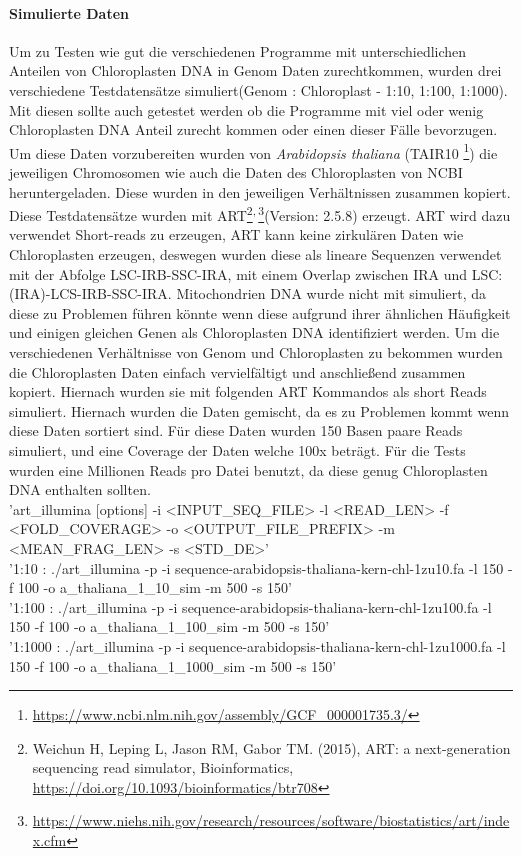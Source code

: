 \documentclass{scrartcl}
\begin{document}
\paragraph{Simulierte Daten}
\label{sec-3-1-1-1}
Um zu Testen wie gut die verschiedenen Programme mit unterschiedlichen Anteilen von Chloroplasten DNA in
Genom Daten zurechtkommen, wurden drei verschiedene Testdatensätze simuliert(Genom : Chloroplast - 1:10, 1:100, 1:1000). 
Mit diesen sollte auch getestet werden ob die Programme mit viel oder wenig Chloroplasten DNA Anteil zurecht kommen oder einen dieser Fälle 
bevorzugen. Um diese Daten vorzubereiten wurden von \emph{Arabidopsis thaliana} (TAIR10 \footnote{\url{https://www.ncbi.nlm.nih.gov/assembly/GCF_000001735.3/}}) die jeweiligen Chromosomen wie auch die Daten
des Chloroplasten von NCBI heruntergeladen. Diese wurden in den jeweiligen Verhältnissen zusammen kopiert.
Diese Testdatensätze wurden mit ART\footnote{Weichun H, Leping L, Jason RM, Gabor TM. (2015), ART: a next-generation sequencing read simulator, Bioinformatics, \url{https://doi.org/10.1093/bioinformatics/btr708}}\textsuperscript{,}\,\footnote{\url{https://www.niehs.nih.gov/research/resources/software/biostatistics/art/index.cfm}}(Version: 2.5.8) erzeugt. ART wird dazu verwendet Short-reads zu erzeugen, ART kann keine zirkulären Daten wie Chloroplasten 
erzeugen, deswegen wurden diese als lineare Sequenzen verwendet mit der Abfolge LSC-IRB-SSC-IRA, mit einem Overlap zwischen IRA und LSC: (IRA)-LCS-IRB-SSC-IRA. 
Mitochondrien DNA wurde nicht mit simuliert, da diese zu 
Problemen führen könnte wenn diese aufgrund ihrer ähnlichen Häufigkeit und einigen gleichen Genen als Chloroplasten DNA identifiziert werden. 
Um die verschiedenen Verhältnisse von Genom und Chloroplasten zu bekommen wurden die Chloroplasten Daten einfach
vervielfältigt und anschließend zusammen kopiert. Hiernach wurden sie mit folgenden ART Kommandos als short Reads simuliert.
Hiernach wurden die Daten gemischt, da es zu Problemen kommt wenn diese Daten sortiert sind. Für diese Daten wurden 150 Basen paare Reads simuliert, 
und eine Coverage der Daten welche 100x beträgt. 
Für die Tests wurden eine Millionen Reads pro Datei benutzt, da diese genug Chloroplasten DNA enthalten sollten.
\\
'art\_illumina [options] -i <INPUT\_SEQ\_FILE> -l <READ\_LEN> -f <FOLD\_COVERAGE> -o <OUTPUT\_FILE\_PREFIX> -m <MEAN\_FRAG\_LEN> -s <STD\_DE>'
\\
'1:10 : ./art\_illumina -p -i sequence-arabidopsis-thaliana-kern-chl-1zu10.fa -l 150 -f 100 -o a\_thaliana\_1\_10\_sim -m 500 -s 150'
\\
'1:100 :  ./art\_illumina -p -i sequence-arabidopsis-thaliana-kern-chl-1zu100.fa -l 150 -f 100 -o a\_thaliana\_1\_100\_sim -m 500 -s 150'
\\
'1:1000 :  ./art\_illumina -p -i sequence-arabidopsis-thaliana-kern-chl-1zu1000.fa -l 150 -f 100 -o a\_thaliana\_1\_1000\_sim -m 500 -s 150'
\end{document}

